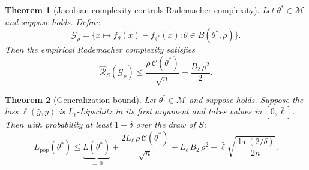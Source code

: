 \documentclass[11pt,a4paper]{article}
\newtheorem{theorem}{Theorem}
\theoremstyle{definition}
\theoremstyle{remark}
\newcommand{\cM}{\mathcal{M}}
\newcommand{\cC}{\mathcal{C}}
\newcommand{\cG}{\mathcal{G}}
\begin{document}
\begin{theorem}[Jacobian complexity controls Rademacher complexity]\label{thm:rad}
  Let $\theta^* \in \cM$ and suppose  holds.  Define
  \[
    \cG_\rho = \bigl\{x \mapsto f_\theta(x) - f_{\theta^*}(x)
    : \theta \in B(\theta^*, \rho)\bigr\}.
  \]
  Then the empirical Rademacher complexity satisfies
  \begin{equation}\label{eq:rad}
    \hat{\mathcal{R}}_S(\cG_\rho)
    \leq \frac{\rho\,\cC(\theta^*)}{\sqrt{n}} + \frac{B_2\,\rho^2}{2}.
  \end{equation}
\end{theorem}

\begin{theorem}[Generalization bound]\label{thm:gen}
  Let $\theta^* \in \cM$ and suppose  holds.
  Suppose the loss $\ell(\hat{y}, y)$ is $L_\ell$-Lipschitz in its first argument
  and takes values in $[0, \bar{\ell}]$.
  Then with probability at least $1 - \delta$ over the draw of $S$:
  \begin{equation}\label{eq:gen}
    L_{\mathrm{pop}}(\theta^*)
    \leq \underbrace{L(\theta^*)}_{=\,0}
    + \frac{2 L_\ell\,\rho\,\cC(\theta^*)}{\sqrt{n}}
    + L_\ell\, B_2\,\rho^2
    + \bar{\ell}\sqrt{\frac{\ln(2/\delta)}{2n}}.
  \end{equation}
\end{theorem}
\end{document}
